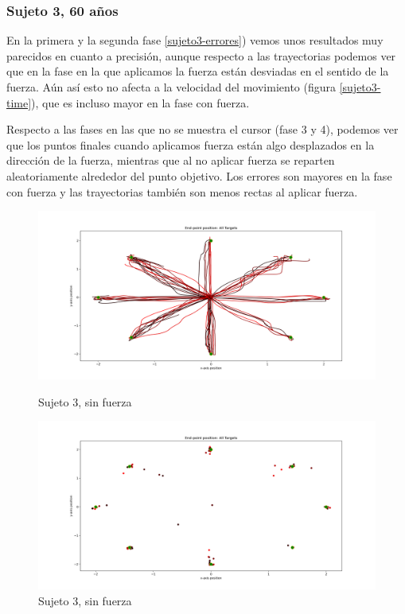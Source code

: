 \documentclass[a4paper,11pt, oneside]{book}
\begin{document}
\subsubsection{Sujeto 3, 60 años}

En la primera y la segunda fase \ref{sujeto3-errores}) vemos unos resultados muy parecidos en cuanto a precisión, aunque respecto a las trayectorias podemos ver que en la fase en la que aplicamos la fuerza están desviadas en el sentido de la fuerza. Aún así esto no afecta a la velocidad del movimiento (figura \ref{sujeto3-time}), que es incluso mayor en la fase con fuerza.

Respecto a las fases en las que no se muestra el cursor (fase 3 y 4), podemos ver que los puntos finales cuando aplicamos fuerza están algo desplazados en la dirección de la fuerza, mientras que al no aplicar fuerza se reparten aleatoriamente alrededor del punto objetivo. Los errores son mayores en la fase con fuerza y las trayectorias también son menos rectas al aplicar fuerza.

\begin{figure}[H]
	\begin{minipage}[b]{0.5\linewidth}
		\centering
		\includegraphics[width=\linewidth]{sujeto3/no_force/trayectorias}
		\caption{Sujeto 3, sin fuerza}
		\label{3-fase1-1}
	\end{minipage}
	\hspace{0.5cm}
	\begin{minipage}[b]{0.5\linewidth}
		\centering
		\includegraphics[width=\linewidth]{sujeto3/no_force/trayectorias_puntos}
		\caption{Sujeto 3, sin fuerza}
		\label{3-fase1-2}
	\end{minipage}
\end{figure}
\end{document}
